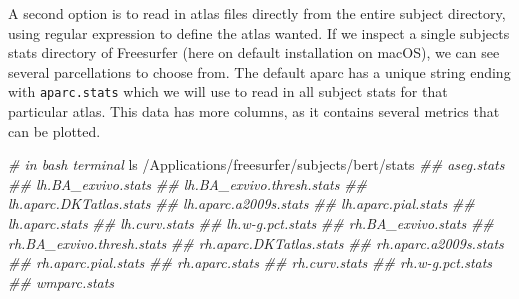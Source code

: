 \documentclass[fleqn,10pt]{wlpeerj} %
\newenvironment{Shaded}{\begin{snugshade}}{\end{snugshade}}
\newcommand{\CommentTok}[1]{\textcolor[rgb]{0.56,0.35,0.01}{\textit{#1}}}
\newcommand{\FunctionTok}[1]{\textcolor[rgb]{0.00,0.00,0.00}{#1}}
\newcommand{\NormalTok}[1]{#1}
\begin{document}
\normalsize

A second option is to read in atlas files directly from the entire subject directory, using regular expression to define the atlas wanted.
If we inspect a single subjects stats directory of Freesurfer (here on default installation on macOS), we can see several parcellations to choose from.
The default aparc has a unique string ending with \texttt{aparc.stats} which we will use to read in all subject stats for that particular atlas.
This data has more columns, as it contains several metrics that can be plotted.

\begin{Shaded}
\begin{Highlighting}[]
\CommentTok{\# in bash terminal}
\FunctionTok{ls}\NormalTok{ /Applications/freesurfer/subjects/bert/stats}
\CommentTok{\#\# aseg.stats}
\CommentTok{\#\# lh.BA\_exvivo.stats}
\CommentTok{\#\# lh.BA\_exvivo.thresh.stats}
\CommentTok{\#\# lh.aparc.DKTatlas.stats}
\CommentTok{\#\# lh.aparc.a2009s.stats}
\CommentTok{\#\# lh.aparc.pial.stats}
\CommentTok{\#\# lh.aparc.stats}
\CommentTok{\#\# lh.curv.stats}
\CommentTok{\#\# lh.w{-}g.pct.stats}
\CommentTok{\#\# rh.BA\_exvivo.stats}
\CommentTok{\#\# rh.BA\_exvivo.thresh.stats}
\CommentTok{\#\# rh.aparc.DKTatlas.stats}
\CommentTok{\#\# rh.aparc.a2009s.stats}
\CommentTok{\#\# rh.aparc.pial.stats}
\CommentTok{\#\# rh.aparc.stats}
\CommentTok{\#\# rh.curv.stats}
\CommentTok{\#\# rh.w{-}g.pct.stats}
\CommentTok{\#\# wmparc.stats}
\end{Highlighting}
\end{Shaded}
\end{document}
